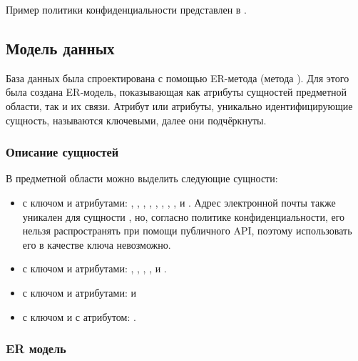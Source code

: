 \tab
Пример политики конфиденциальности представлен в .

\subsection{Модель данных}

\tab
База данных была спроектирована с помощью ER-метода (метода ).
Для этого была создана ER‐модель, показывающая как атрибуты сущностей предметной области, так и их связи.
Атрибут или атрибуты, уникально идентифицирующие сущность, называются ключевыми, далее они подчёркнуты.

\subsubsection{Описание сущностей}

\tab
В предметной области можно выделить следующие сущности:
\begin{itemize}
	\item {} с ключом  и атрибутами: , , , , , , , ,  и . Адрес электронной почты также уникален для сущности , но, согласно политике конфиденциальности, его нельзя распространять при помощи публичного API, поэтому использовать его в качестве ключа невозможно.
	\item {} с ключом  и атрибутами: , , , ,  и .
	\item {} с ключом  и атрибутами:  и 
	\item {} с ключом  и с атрибутом: .
\end{itemize}

\subsubsection{ER модель}

